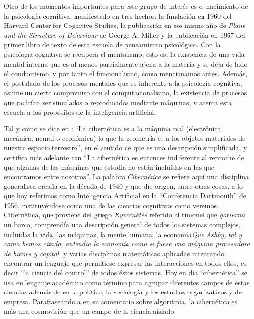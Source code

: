 \documentclass[12pt]{memoir}
\begin{document}
\begin{appendices}
Otro de los momentos importantes para este grupo de interés es el nacimiento de la psicología cognitiva, manifestado en tres hechos: la fundación en 1960 del Harvard Center for Cognitive Studies, la publicación en ese mismo año de \textit{Plans and the Structure of Behaviour} de George A. Miller y la publicación en 1967 del primer libro de texto de esta escuela de pensamiento psicológico. Con la psicología cognitiva se recupera el mentalismo, esto es, la existencia de una vida mental interna que es al menos parcialmente ajena a la materia y se deja de lado el conductismo, y por tanto el funcionalismo, como mencionamos antes. Además, el postulado de los procesos mentales que es inherente a la psicología cognitiva, asume un cierto compromiso con el computacionalismo, la existencia de procesos que podrían ser simulados o reproducidos mediante máquinas, y acerca esta escuela a los propósitos de la inteligencia artificial.


 Tal y como se dice en \parencite{ciberneticsAshby}: ``La cibernética es a la máquina real (electrónica, mecánica, neural o económica) lo que la geometría es a los objetos materiales de nuestro espacio terrestre'', en el sentido de que es una descripción simplificada, y certifica más adelante con ``La cibernética es entonces indiferente al reproche de que algunas de las máquinas que estudia no están incluídas en las que encontramos entre nosotros''. La palabra \textit{Cibernética} se refiere aquí una disciplina generalista creada en la década de 1940 y que dio origen, entre otras cosas, a lo que hoy referimos como Inteligencia Artificial en la ``Conferencia Dartmouth'' de 1956, instituyéndose como una de las ciencias cognitivas como veremos. Cibernética, que proviene del griego \textit{Kyvernêtès} referido al timonel que \textit{gobierna} un barco, comprendía una descripción general de todos los sistemas complejos, incluídas la vida, las máquinas, la mente humana, la economía\textit{Que Ashby, tal y como hemos citado, entendía la economía como si fuese una máquina procesadora de bienes y capital.} y varias disciplinas matemáticas aplicadas intentando encontrar un lenguaje que permitiese expresar las interacciones en todos ellos, es decir ``la ciencia del control'' de todos éstos sistemas. Hoy en día ``cibernética'' se usa en lengauje académico como término para agrupar diferentes campos de éstas ciencias además de en la política, la sociología y los estudios organizativos y de empresa. Parafraseando a \parencite{pylyshyn70} en su comentario sobre algoritmia, la cibernética es más una cosmovisión que un campo de la ciencia aislado.


\end{appendices}
\end{document}

